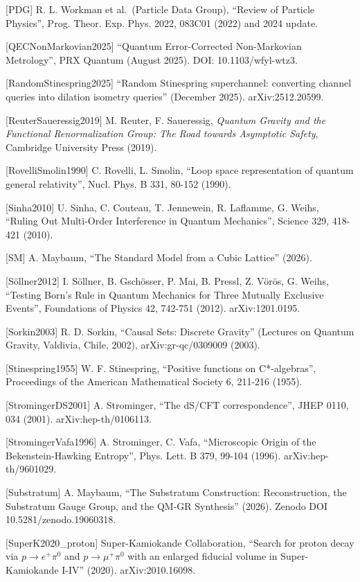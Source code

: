 \documentclass[
]{article}
\begin{document}
{[}PDG{]} R. L. Workman et al.~(Particle Data Group), ``Review of
Particle Physics'', Prog. Theor. Exp. Phys. 2022, 083C01 (2022) and 2024
update.

{[}QECNonMarkovian2025{]} ``Quantum Error-Corrected Non-Markovian
Metrology'', PRX Quantum (August 2025). DOI: 10.1103/wfyl-wtz3.

{[}RandomStinespring2025{]} ``Random Stinespring superchannel:
converting channel queries into dilation isometry queries'' (December
2025). arXiv:2512.20599.

{[}ReuterSaueressig2019{]} M. Reuter, F. Saueressig, \emph{Quantum
Gravity and the Functional Renormalization Group: The Road towards
Asymptotic Safety}, Cambridge University Press (2019).

{[}RovelliSmolin1990{]} C. Rovelli, L. Smolin, ``Loop space
representation of quantum general relativity'', Nucl. Phys. B 331,
80-152 (1990).

{[}Sinha2010{]} U. Sinha, C. Couteau, T. Jennewein, R. Laflamme, G.
Weihs, ``Ruling Out Multi-Order Interference in Quantum Mechanics'',
Science 329, 418-421 (2010).

{[}SM{]} A. Maybaum, ``The Standard Model from a Cubic Lattice'' (2026).

{[}Söllner2012{]} I. Söllner, B. Gschösser, P. Mai, B. Pressl, Z. Vörös,
G. Weihs, ``Testing Born's Rule in Quantum Mechanics for Three Mutually
Exclusive Events'', Foundations of Physics 42, 742-751 (2012).
arXiv:1201.0195.

{[}Sorkin2003{]} R. D. Sorkin, ``Causal Sets: Discrete Gravity''
(Lectures on Quantum Gravity, Valdivia, Chile, 2002),
arXiv:gr-qc/0309009 (2003).

{[}Stinespring1955{]} W. F. Stinespring, ``Positive functions on
C*-algebras'', Proceedings of the American Mathematical Society 6,
211-216 (1955).

{[}StromingerDS2001{]} A. Strominger, ``The dS/CFT correspondence'',
JHEP 0110, 034 (2001). arXiv:hep-th/0106113.

{[}StromingerVafa1996{]} A. Strominger, C. Vafa, ``Microscopic Origin of
the Bekenstein-Hawking Entropy'', Phys. Lett. B 379, 99-104 (1996).
arXiv:hep-th/9601029.

{[}Substratum{]} A. Maybaum, ``The Substratum Construction:
Reconstruction, the Substratum Gauge Group, and the QM-GR Synthesis''
(2026). Zenodo DOI 10.5281/zenodo.19060318.

{[}SuperK2020\_proton{]} Super-Kamiokande Collaboration, ``Search for
proton decay via \(p \to e^+\pi^0\) and \(p \to \mu^+\pi^0\) with an
enlarged fiducial volume in Super-Kamiokande I-IV'' (2020).
arXiv:2010.16098.
\end{document}
